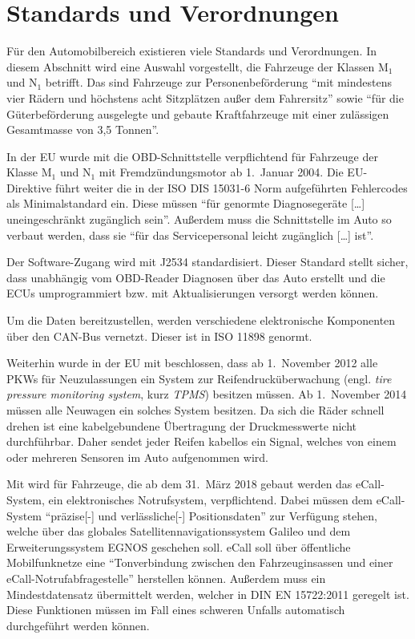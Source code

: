 \section{Standards und Verordnungen}\label{sec:standards}
Für den Automobilbereich existieren viele Standards und Verordnungen. In diesem
Abschnitt wird eine Auswahl vorgestellt, die Fahrzeuge der Klassen M$_1$ und
N$_1$ betrifft. Das sind Fahrzeuge zur Personenbeförderung
\enquote{mit mindestens vier Rädern und höchstens acht Sitzplätzen außer dem Fahrersitz}
sowie \enquote{für die Güterbeförderung ausgelegte und gebaute Kraftfahrzeuge
mit einer zulässigen Gesamtmasse von 3,5 Tonnen}\cite{Richtlinie70/156/EWG:Fahrzeugklassen}.

In der EU wurde mit \cite{EUDirective98/69/EC} die OBD-Schnittstelle
verpflichtend für Fahrzeuge der Klasse M$_1$ und N$_1$ mit Fremdzündungsmotor
ab 1.~Januar 2004. Die EU-Direktive führt weiter die in der ISO DIS 15031-6
Norm aufgeführten Fehlercodes als Minimalstandard ein. Diese müssen
\enquote{für genormte Diagnosegeräte [\dots] uneingeschränkt zugänglich sein}.
Außerdem muss die Schnittstelle im Auto so verbaut werden, dass sie
\enquote{für das Servicepersonal leicht zugänglich [\dots] ist}.

Der Software-Zugang wird mit J2534 \cite{SAE2004} standardisiert. Dieser
Standard stellt sicher, dass unabhängig vom OBD-Reader Diagnosen über das
Auto erstellt und die ECUs umprogrammiert bzw. mit Aktualisierungen versorgt
werden können.

Um die Daten bereitzustellen, werden verschiedene elektronische Komponenten
über den CAN-Bus vernetzt. Dieser ist in ISO 11898 genormt.

Weiterhin wurde in der EU mit \cite{EURegulation661/2009} beschlossen, dass ab
1.~November 2012 alle PKWs für Neuzulassungen ein System zur
Reifendrucküberwachung (engl. \textit{tire pressure monitoring system}, kurz
\textit{TPMS}) besitzen müssen. Ab 1.~November 2014 müssen alle Neuwagen ein
solches System besitzen. Da sich die Räder schnell drehen ist eine
kabelgebundene Übertragung der Druckmesswerte nicht durchführbar. Daher sendet
jeder Reifen kabellos ein Signal, welches von einem oder mehreren Sensoren im
Auto aufgenommen wird.

Mit \cite{EURegulation2015/ecall} wird für Fahrzeuge, die ab dem 31.~März 2018
gebaut werden das eCall-System, ein elektronisches Notrufsystem, verpflichtend.
Dabei müssen dem eCall-System \enquote{präzise[-] und verlässliche[-]
Positionsdaten} zur Verfügung stehen, welche über das globales
Satellitennavigationssystem Galileo und dem Erweiterungssystem EGNOS geschehen
soll. eCall soll über öffentliche Mobilfunknetze eine \enquote{Tonverbindung
zwischen den Fahrzeuginsassen und einer eCall-Notrufabfragestelle} herstellen
können. Außerdem muss ein Mindestdatensatz übermittelt werden, welcher in
DIN EN 15722:2011 geregelt ist. Diese Funktionen müssen im Fall eines schweren
Unfalls automatisch durchgeführt werden können.